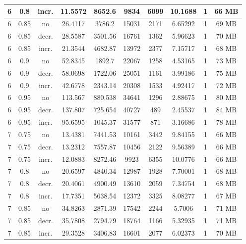 \begin{longtable}{c|c|c|c|c|c|c|c|c|c}
  6   &  0.8   & incr. & 11.5572  &  8652.6   &  9834   &  6099  &  10.1688  &  1  &  66  MB \\
  \hline
  6   &  0.85  & no    & 26.4117  &  3786.2   &  15031  &  2171  &  6.65292  &  1  &  69  MB \\
  6   &  0.85  & decr. & 28.5587  &  3501.56  &  16761  &  1362  &  5.96623  &  1  &  70  MB \\
  6   &  0.85  & incr. & 21.3544  &  4682.87  &  13972  &  2377  &  7.15717  &  1  &  68  MB \\
  \hline
  6   &  0.9   & no    & 52.8345  &  1892.7   &  22067  &  1258  &  4.53165  &  1  &  73  MB \\
  6   &  0.9   & decr. & 58.0698  &  1722.06  &  25051  &  1161  &  3.99186  &  1  &  75  MB \\
  6   &  0.9   & incr. & 42.6778  &  2343.14  &  20308  &  1533  &  4.92417  &  1  &  72  MB \\
  \hline
  6   &  0.95  & no    & 113.567  &  880.538  &  34641  &  1296  &  2.88675  &  1  &  80  MB \\
  6   &  0.95  & decr. & 137.807  &  725.654  &  40727  &  489   &  2.45537  &  1  &  84  MB \\
  6   &  0.95  & incr. & 95.6595  &  1045.37  &  31577  &  871   &  3.16686  &  1  &  78  MB \\
  \hline
  7   &  0.75  & no    & 13.4381  &  7441.53  &  10161  &  3442  &  9.84155  &  1  &  66  MB \\
  7   &  0.75  & decr. & 13.2312  &  7557.87  &  10456  &  2122  &  9.56389  &  1  &  66  MB \\
  7   &  0.75  & incr. & 12.0883  &  8272.46  &  9923   &  6355  &  10.0776  &  1  &  66  MB \\
  \hline
  7   &  0.8   & no    & 20.6597  &  4840.34  &  12987  &  1928  &  7.70001  &  1  &  68  MB \\
  7   &  0.8   & decr. & 20.4061  &  4900.49  &  13610  &  2059  &  7.34754  &  1  &  68  MB \\
  7   &  0.8   & incr. & 17.7351  &  5638.54  &  12372  &  3325  &  8.08277  &  1  &  67  MB \\
  \hline
  7   &  0.85  & no    & 34.8263  &  2871.39  &  17542  &  2244  &  5.7006   &  1  &  71  MB \\
  7   &  0.85  & decr. & 35.7808  &  2794.79  &  18764  &  1166  &  5.32935  &  1  &  71  MB \\
  7   &  0.85  & incr. & 29.3528  &  3406.83  &  16601  &  2077  &  6.02373  &  1  &  70  MB \\

\end{longtable}
